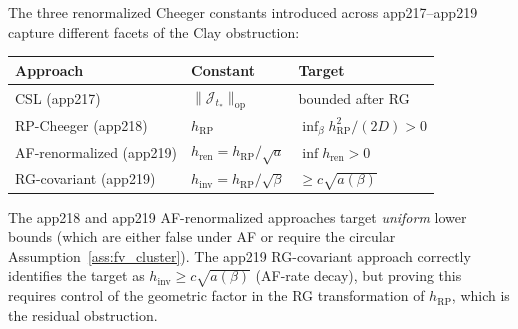 \begin{remark}
\label{rem:three_approaches}
The three renormalized Cheeger constants introduced across
app217--app219 capture different facets of the Clay obstruction:
\begin{center}
\begin{tabular}{lll}
\hline
Approach & Constant & Target \\
\hline
CSL (app217) & $\|\mathcal{J}_{t_{*}}\|_{\mathrm{op}}$ & bounded after RG \\
RP-Cheeger (app218) & $h_{\mathrm{RP}}$ & $\inf_{\beta}h_{\mathrm{RP}}^{2}/(2D)>0$ \\
AF-renormalized (app219) & $h_{\mathrm{ren}}=h_{\mathrm{RP}}/\sqrt{a}$ & $\inf h_{\mathrm{ren}}>0$ \\
RG-covariant (app219) & $h_{\mathrm{inv}}=h_{\mathrm{RP}}/\sqrt{\beta}$ & $\ge c\sqrt{a(\beta)}$ \\
\hline
\end{tabular}
\end{center}
The app218 and app219 AF-renormalized approaches target
\emph{uniform} lower bounds (which are either false under AF or
require the circular Assumption~\ref{ass:fv_cluster}). The
app219 RG-covariant approach correctly identifies the target as
$h_{\mathrm{inv}}\ge c\sqrt{a(\beta)}$ (AF-rate decay), but
proving this requires control of the geometric factor in the RG
transformation of $h_{\mathrm{RP}}$, which is the residual
obstruction.
\end{remark}

\endinput
